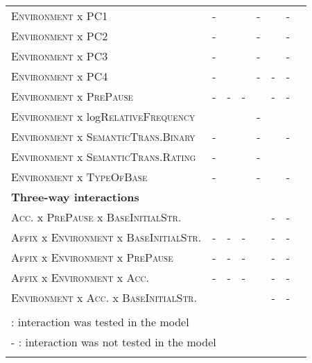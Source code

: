 \begin{table}
{\begin{tabular}{llrrrrrr}
	\textsc{Environment} x \textsc{PC1}  &- &\checkmark&\checkmark&-&\checkmark&-\\
	\textsc{Environment} x \textsc{PC2}  & -&\checkmark&\checkmark&-&\checkmark&-\\
	\textsc{Environment} x \textsc{PC3}  & -&\checkmark&\checkmark&-&\checkmark&-\\
	\textsc{Environment} x \textsc{PC4}  & -&\checkmark&\checkmark&-&-&-\\
	
		\textsc{Environment} x \textsc{PrePause}  & -&-&-&\checkmark&-&-\\
		
	
	\textsc{Environment} x log\textsc{RelativeFrequency}  & \checkmark&\checkmark&\checkmark&-&\checkmark&\checkmark\\
	\textsc{Environment} x \textsc{SemanticTrans.Binary}  & -&\checkmark&\checkmark&-&\checkmark&-\\
	\textsc{Environment} x \textsc{SemanticTrans.Rating}  &- &\checkmark&\checkmark&-&\checkmark&\checkmark\\
	\textsc{Environment} x \textsc{TypeOfBase}  & -&\checkmark&\checkmark&-&\checkmark&-\\
	
	\midrule 

		 \textbf{Three-way interactions} & &&&& &\\
		 \midrule
		 \textsc{Acc.} x \textsc{PrePause} x \textsc{BaseInitialStr.} & \checkmark&\checkmark&\checkmark&\checkmark&-&-\\
		 \textsc{Affix} x \textsc{Environment} x \textsc{BaseInitialStr.} & -&-&-&\checkmark&- &-\\
		 \textsc{Affix} x \textsc{Environment} x \textsc{PrePause} & -&-&-&\checkmark&- &-\\
		 \textsc{Affix} x \textsc{Environment} x \textsc{Acc.} & -&-&-&\checkmark&- &-\\
		 
		 	\textsc{Environment} x \textsc{Acc.} x \textsc{BaseInitialStr.}  & \checkmark&\checkmark&\checkmark&\checkmark&-&-\\
	 	
		 \midrule
	\\
	\multicolumn{6}{l}{\small \checkmark \hspace*{0.2cm}: interaction was tested in the model} & \\			
	\multicolumn{6}{l}{\small - \hspace*{0.45cm}: interaction was not tested in the model} & \\			
	\lspbottomrule 
			\end{tabular}
}


\end{table}






